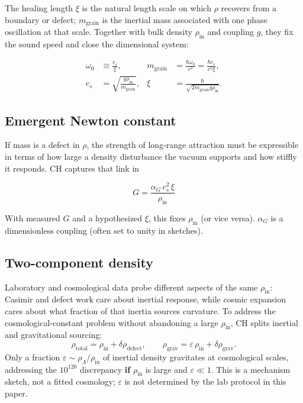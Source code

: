 \documentclass[11pt,a4paper]{article}
\begin{document}
The healing length $\xi$ is the natural length scale on which $\rho$ recovers from a boundary or defect; $m_{\mathrm{grain}}$ is the inertial mass associated with one phase oscillation at that scale.
Together with bulk density $\rho_{\mathrm{in}}$ and coupling $g$, they fix the sound speed and close the dimensional system:

\begin{align}
  \omega_0 &\equiv \frac{c_s}{\xi}, &
  m_{\mathrm{grain}} &= \frac{\hbar\omega_0}{c^2} = \frac{\hbar c_s}{c^2\xi},
  \label{eq:grain} \\
  c_s &= \sqrt{\frac{g\rho_{\mathrm{in}}}{m_{\mathrm{grain}}}}, &
  \xi &= \frac{\hbar}{\sqrt{2 m_{\mathrm{grain}} g \rho_{\mathrm{in}}}}.
  \label{eq:healing}
\end{align}

\subsection{Emergent Newton constant}

If mass is a defect in $\rho$, the strength of long-range attraction must be expressible in terms of how large a density disturbance the vacuum supports and how stiffly it responds.
CH captures that link in

\begin{equation}
  \boxed{G = \frac{\alpha_G\, c_s^2\, \xi}{\rho_{\mathrm{in}}}}
  \label{eq:G}
\end{equation}

With measured $G$ and a hypothesized $\xi$, this fixes $\rho_{\mathrm{in}}$ (or vice versa).
$\alpha_G$ is a dimensionless coupling (often set to unity in sketches).

\subsection{Two-component density}

Laboratory and cosmological data probe different aspects of the same $\rho_{\mathrm{in}}$: Casimir and defect work care about inertial response, while cosmic expansion cares about what fraction of that inertia sources curvature.
To address the cosmological-constant problem without abandoning a large $\rho_{\mathrm{in}}$, CH splits inertial and gravitational sourcing:
\begin{equation}
  \rho_{\mathrm{total}} = \rho_{\mathrm{in}} + \delta\rho_{\mathrm{defect}}, \qquad
  \rho_{\mathrm{grav}} = \varepsilon\,\rho_{\mathrm{in}} + \delta\rho_{\mathrm{grav}}.
  \label{eq:two-component}
\end{equation}
Only a fraction $\varepsilon \sim \rho_\Lambda/\rho_{\mathrm{in}}$ of inertial density gravitates at cosmological scales, addressing the $10^{120}$ discrepancy \textbf{if} $\rho_{\mathrm{in}}$ is large and $\varepsilon \ll 1$.
This is a mechanism sketch, not a fitted cosmology; $\varepsilon$ is not determined by the lab protocol in this paper.
\end{document}
